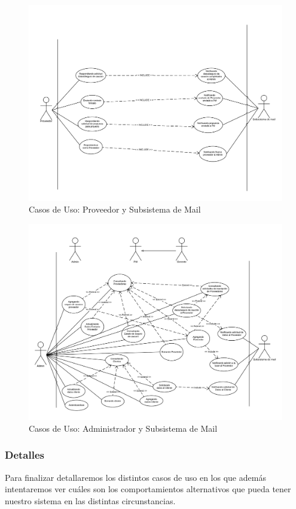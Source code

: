 \begin{figure}[H]
    \centering
    \includegraphics[width=\linewidth]{diag/viejos/cu5.pdf}
    \caption{Casos de Uso: Proveedor y Subsistema de Mail}
    \label{cu5}
\end{figure}

\begin{figure}[H]
    \centering
    \includegraphics[width=\linewidth]{diag/viejos/cu6.pdf}
    \caption{Casos de Uso: Administrador y Subsistema de Mail}
    \label{cu6}
\end{figure}

\subsubsection{Detalles}
Para finalizar detallaremos los distintos casos de uso en los que además intentaremos ver cuáles son los comportamientos alternativos que pueda tener nuestro sistema en las distintas circunstancias.


